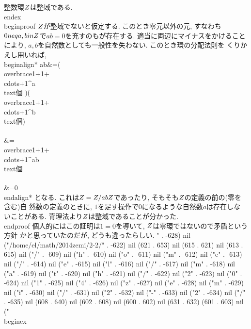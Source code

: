  整数環$\\Z$は整域である. 
 \\end{ex}
 \\begin{proof}
  $\\Z$が整域でないと仮定する. このとき零元以外の元, すなわち$0\\neq a,
  b\\in\\Z$で$ab=0$を充すのもが存在する. 適当に両辺にマイナスをかけること
  により, $a, b$を自然数としても一般性を失わない. このとき環の分配法則を
  くりかえし用いれば,
  \\begin{align*}
   ab&=(\\overbrace{1+1+\\cdots+1}^{a\\text{個
   }})(\\overbrace{1+1+\\cdots+1}^{b\\text{個}})\\\\
   &=\\overbrace{1+1+\\cdots+1}^{ab\\text{個}}\\\\
   &=0
  \\end{align*}
 となる. これは$\\Z=\\Z/ab\\Z$であったり, そもそも$\\Z$の定義の前の(零を含む)自
  然数の定義のときに, $1$を足す操作で$0$になるような自然数$a$は存在しな
  いことがある. 背理法より$\\Z$は整域であることが分かった. 
 \\end{proof}
 個人的にはこの証明は$1=0$を導いて, $\\Z$は零環ではないので矛盾という方針
 かと思っていたのだが, どうも違ったらしい.
" . -628) nil ("/home/el/math/2014zemi/2-2/" . -622) nil (621 . 653) nil (615 . 621) nil (613 . 615) nil ("/" . -609) nil ("h" . -610) nil ("o" . -611) nil ("m" . -612) nil ("e" . -613) nil ("/" . -614) nil ("e" . -615) nil ("l" . -616) nil ("/" . -617) nil ("m" . -618) nil ("a" . -619) nil ("t" . -620) nil ("h" . -621) nil ("/" . -622) nil ("2" . -623) nil ("0" . -624) nil ("1" . -625) nil ("4" . -626) nil ("z" . -627) nil ("e" . -628) nil ("m" . -629) nil ("i" . -630) nil ("/" . -631) nil ("2" . -632) nil ("-" . -633) nil ("2" . -634) nil ("/" . -635) nil (608 . 640) nil (602 . 608) nil (600 . 602) nil (631 . 632) (601 . 603) nil (" \\begin{ex}

